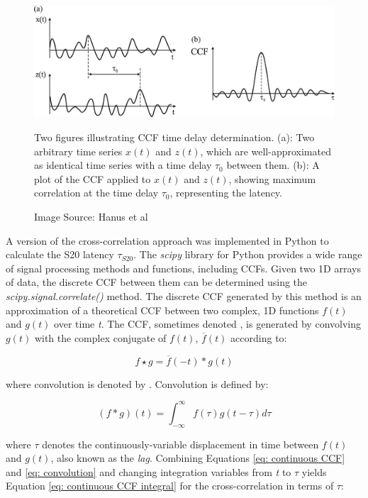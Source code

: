 \begin{figure}[h!]
    \centering
    \includegraphics[width=1\linewidth]{figures/hanus diagram.jpg}
    \caption{Two figures illustrating CCF time delay determination. (a): Two arbitrary time series \(x(t)\) and \(z(t)\), which are well-approximated as identical time series with a time delay \(\tau_0\) between them. (b): A plot of the CCF applied to \(x(t)\) and \(z(t)\), showing maximum correlation at the time delay \(\tau_0\), representing the latency.}
    \caption*{Image Source: Hanus et al\cite{hanus2019}}
    \label{fig: Hanus CCF}
\end{figure}

A version of the cross-correlation approach was implemented in Python to calculate the S20 latency \(\tau_{S20}\). The \textit{scipy} library for Python provides a wide range of signal processing methods and functions, including CCFs\cite{2020SciPy}. Given two 1D arrays of data, the discrete CCF between them can be determined using the \textit{scipy.signal.correlate()} method\cite{2020SciPy}. The discrete CCF generated by this method is an approximation of a theoretical CCF between two complex, 1D functions \(f(t)\) and \(g(t)\) over time \textit{t}. The CCF, sometimes denoted , is generated by convolving \(g(t)\) with the complex conjugate of \(f(t)\), \(\overline{f}(t)\) according to:

\begin{equation} \label{eq: continuous CCF}
    f\star g=\overline{f}(-t)\ast g(t)
\end{equation}

where convolution is denoted by \q{\(\ast\)}\cite{bracewell1986}\cite{CCFs}. Convolution is defined by:

\begin{equation} \label{eq: convolution}
    (f\ast g)(t)=\int_{-\infty}^{\infty}f(\tau)g(t-\tau)d\tau
\end{equation}

where \(\tau\) denotes the continuously-variable displacement in time between \(f(t)\) and \(g(t)\)\cite{CCFs}, also known as the \textit{lag}. Combining Equations \ref{eq: continuous CCF} and \ref{eq: convolution} and changing integration variables from \textit{t} to \(\tau\) yields Equation \ref{eq: continuous CCF integral} for the cross-correlation in terms of \(\tau\):

